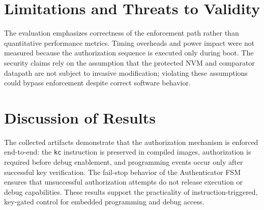 \section{Limitations and Threats to Validity}
The evaluation emphasizes correctness of the enforcement path rather than quantitative
performance metrics. Timing overheads and power impact were not measured because the
authorization sequence is executed only during boot. The security claims rely on the
assumption that the protected NVM and comparator datapath are not subject to invasive
modification; violating these assumptions could bypass enforcement despite correct software
behavior.

\section{Discussion of Results}
The collected artifacts demonstrate that the authorization mechanism is enforced end-to-end:
the \texttt{kc} instruction is preserved in compiled images, authorization is required before
debug enablement, and programming events occur only after successful key verification. The
fail-stop behavior of the Authenticator FSM ensures that unsuccessful authorization attempts do
not release execution or debug capabilities. These results support the practicality of
instruction-triggered, key-gated control for embedded programming and debug access.
